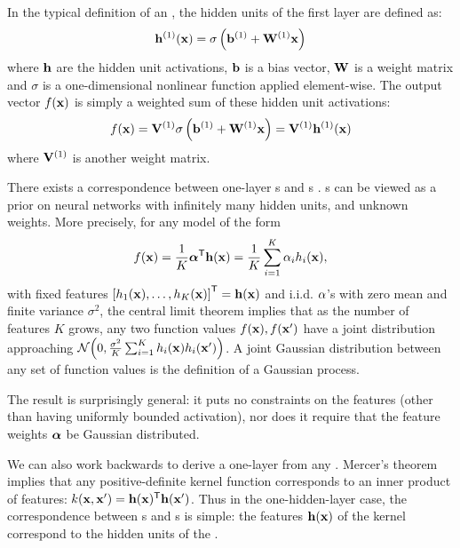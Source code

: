 In the typical definition of an \MLP{}, the hidden units of the first layer are defined as:
%
\begin{align}
{\bf{h}}^{(1)}({\bf{x}}) = \sigma \left( {\bf{b}}^{(1)} + \mathbf{W}^{(1)}{\bf{x}} \right)
\end{align}
%
where ${\bf{h}}$ are the hidden unit activations, ${\bf{b}}$ is a bias vector, $\mathbf{W}$ is a weight matrix and $\sigma$ is a one-dimensional nonlinear function applied element-wise. The output vector $f({\bf{x}})$ is simply a weighted sum of these hidden unit activations:
%
\begin{align}
f({\bf{x}}) = \mathbf{V}^{(1)} \sigma \left( {\bf{b}}^{(1)} + \mathbf{W}^{(1)} {\bf{x}} \right)  = \mathbf{V}^{(1)} {\bf{h}}^{(1)}({\bf{x}})
\label{eq:one-layer-nn}
\end{align}
%
where $\mathbf{V}^{(1)}$ is another weight matrix.

There exists a correspondence between one-layer \MLP{}s and \gp{}s \citep{neal1995bayesian}.
\gp{}s can be viewed as a prior on neural networks with infinitely many hidden units, and unknown weights.
More precisely, for any model of the form
%
\begin{align}
f({\bf{x}}) = \frac{1}{K}{\mathbf {\boldsymbol{\alpha}}}^{\mathsf{T}} {\bf{h}}({\bf{x}}) = \frac{1}{K} \sum_{i=1}^K \alpha_i h_i({\bf{x}}),
\label{eq:one-layer-gp}
\end{align}
%
with fixed features $\left[ h_1({\bf{x}}), \dots, h_K({\bf{x}}) \right]^{\mathsf{T}} = {\bf{h}}({\bf{x}})$ and i.i.d. $\alpha$'s with zero mean and finite variance $\sigma^2$, the central limit theorem implies that as the number of features $K$ grows, any two function values $f({\bf{x}}), f({\bf{x}}')$ have a joint distribution approaching $\mathcal{N}\!\left(0,\frac{\sigma^2}{K}\sum_{i=1}^K h_i({\bf{x}})h_i({\bf{x}}')\right)$.
A joint Gaussian distribution between any set of function values is the definition of a Gaussian process.

The result is surprisingly general:
it puts no constraints on the features (other than having uniformly bounded activation), nor does it require that the feature weights $\boldsymbol{\alpha}$ be Gaussian distributed.  

We can also work backwards to derive a one-layer \MLP{} from any \gp{}.
Mercer's theorem implies that any positive-definite kernel function corresponds to an inner product of features: $k({\bf{x}}, {\bf{x}}') = {\bf{h}}({\bf{x}}) ^{\mathsf{T}} {\bf{h}}({\bf{x}}')$.
%
Thus in the one-hidden-layer case, the correspondence between \MLP{}s and \gp{}s is simple:
the features ${\bf{h}}({\bf{x}})$ of the kernel correspond to the hidden units of the \MLP{}.




